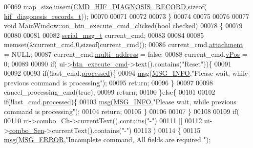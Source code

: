 \begin{DoxyCode}
00069     map\_size.insert(\hyperlink{a00086_a185ed5442d69c7c8abba13323a8e8187}{CMD\_HIF\_DIAGNOSIS\_RECORD},\textcolor{keyword}{sizeof}(
      \hyperlink{a00006_a4726b814166e222a6f13e21453f76d8d}{hif\_diagonesis\_records\_t}));
00070 
00071 
00072 
00073 \}
00074 
00075 
00076 
00077 \textcolor{keywordtype}{void} MainWindow::on\_btn\_execute\_cmd\_clicked(\textcolor{keywordtype}{bool} checked)
00078 \{
00079 
00080 
00081 
00082     \hyperlink{a00004_d3/dd5/a00215}{serial\_msg\_t}     current\_cmd;
00083 
00084 
00085     memset(&current\_cmd,0,\textcolor{keyword}{sizeof}(current\_cmd));
00086     current\_cmd.\hyperlink{a00004_a0b844fe783d7e252159a9641b949e83c}{attachment} = NULL;
00087     current\_cmd.\hyperlink{a00004_a8e69b971c61ced27a7567efd2bf0db59}{multi\_address} = \textcolor{keyword}{false};
00088     current\_cmd.\hyperlink{a00004_a2b48b371fd84be2a8ad581b1ad708b88}{vPos} = 0;
00089 
00090     \textcolor{keywordflow}{if}( ui->\hyperlink{a00080_a9ea50d44e38316e4203933698cbc14a6}{btn\_execute\_cmd}->text().contains(\textcolor{stringliteral}{"Reset"}))\{
00091 
00092 
00093         \textcolor{keywordflow}{if}(!last\_cmd.\hyperlink{a00004_a3e88f779da9798a5da7dda227e2ca388}{processed})\{
00094             \hyperlink{a00017_a6134b74dbfffbaf333e169bd09597b53}{msg}(\hyperlink{a00090_a1ddcc97224a95cec04b38b0ac866fa19}{MSG\_INFO},\textcolor{stringliteral}{"Please wait, while previous command is processing"});
00095             \textcolor{keywordflow}{return};
00096         \}
00097 
00098         cancel\_processing\_cmd(\textcolor{keyword}{true});
00099         \textcolor{keywordflow}{return};
00100     \}\textcolor{keywordflow}{else}\{
00101 
00102         \textcolor{keywordflow}{if}(!last\_cmd.\hyperlink{a00004_a3e88f779da9798a5da7dda227e2ca388}{processed})\{
00103             \hyperlink{a00017_a6134b74dbfffbaf333e169bd09597b53}{msg}(\hyperlink{a00090_a1ddcc97224a95cec04b38b0ac866fa19}{MSG\_INFO},\textcolor{stringliteral}{"Please wait, while previous command is processing"});
00104             \textcolor{keywordflow}{return};
00105         \}
00106 
00107     \}
00108 
00109     \textcolor{keywordflow}{if}(
00110        ui->\hyperlink{a00080_a263fb43f2eff37a44ff7359ba41e2eeb}{combo\_Ch}->currentText().contains(\textcolor{stringliteral}{"-"})
00111     ||
00112        ui->\hyperlink{a00080_ad95005b5fcac8126171019298147b285}{combo\_Sen}->currentText().contains(\textcolor{stringliteral}{"-"})
00113     )
00114     \{
00115         \hyperlink{a00017_a6134b74dbfffbaf333e169bd09597b53}{msg}(\hyperlink{a00090_aa8a990825a5a62c89d2fb8b08d8a1070}{MSG\_ERROR},\textcolor{stringliteral}{"Incomplete command, All fields are required "});

\end{DoxyCode}
